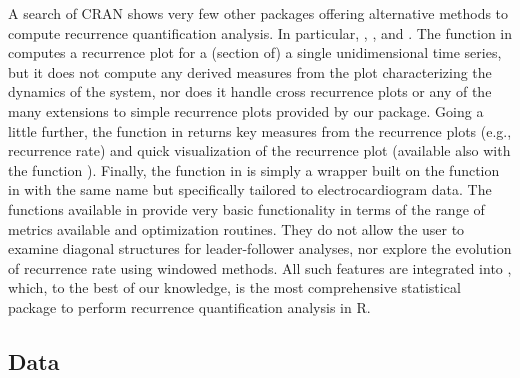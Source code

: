 A search of CRAN shows very few other packages offering alternative methods to compute recurrence quantification analysis. In particular, , , and . The function  in  computes a recurrence plot for a (section of) a single unidimensional time series, but it does not compute any derived measures from the plot characterizing the dynamics of the system, nor does it handle cross recurrence plots or any of the many extensions to simple recurrence plots provided by our  package. Going a little further, the function  in  returns key measures from the recurrence plots (e.g., recurrence rate) and quick visualization of the recurrence plot (available also with the function ). Finally, the function  in  is simply a wrapper built on the function in  with the same name but specifically tailored to electrocardiogram data. The functions available in  provide very basic functionality in terms of the range of metrics available and optimization routines. They do not allow the user to examine diagonal structures for leader-follower analyses, nor explore the evolution of recurrence rate using windowed methods.  All such features are integrated into , which, to the best of our knowledge, is the most comprehensive statistical package to perform recurrence quantification analysis in R. 

\subsection{Data}
\label{sec:data}

